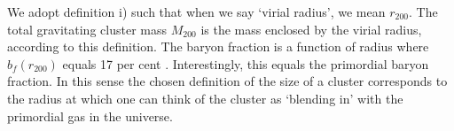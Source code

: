 \documentclass[MScProj_TLRH_ClusterEnergy.tex]{subfiles}
\begin{document}
We adopt definition i) such that when we say `virial radius', we mean $r_{200}$.
The total gravitating cluster mass $M_{200}$ is the mass enclosed by the virial
radius, according to this definition. The baryon fraction
is a function of radius where $b_f(r_{200})$ equals 17 per cent \citep{2013MNRAS.431.1487P}.
Interestingly, this equals the primordial baryon fraction. In this sense the
chosen definition of the size of a cluster corresponds to the radius at which one can
think of the cluster as `blending in' with the primordial gas in the universe.


%   
%   
%   
%   
\end{document}
